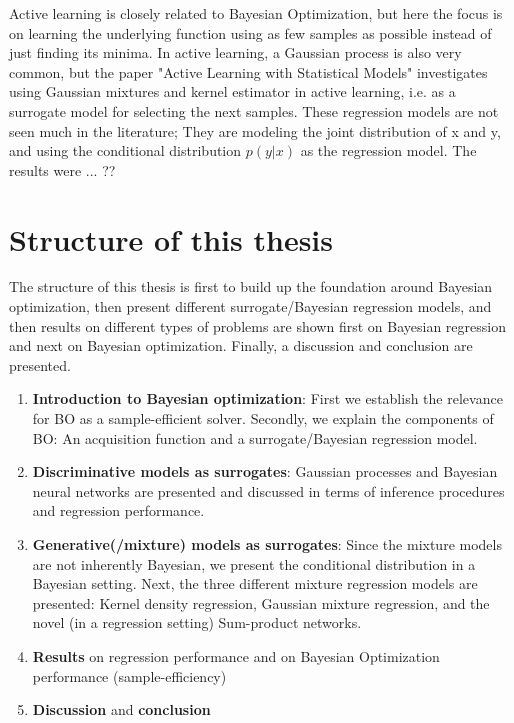 Active learning is closely related to Bayesian Optimization, but here the focus is on learning the
underlying function using as few samples as possible instead of just finding its minima. In active
learning, a Gaussian process is also very common, but the paper "Active Learning with Statistical
Models" \cite{ALStatisticalModels} investigates using Gaussian mixtures and kernel estimator in
active learning, i.e. as a surrogate model for selecting the next samples. These regression
models are not seen much in the literature; They are modeling the joint distribution of x and y, and
using the conditional distribution $p(y|x)$ as the regression model. The results were ... ??

\section{Structure of this thesis}
The structure of this thesis is first to build up the foundation around Bayesian optimization, then
present different surrogate/Bayesian regression models, and then results on different types of
problems are shown first on Bayesian regression and next on Bayesian optimization. Finally, a
discussion and conclusion are presented. 

\begin{enumerate}[noitemsep]
    \item \textbf{Introduction to Bayesian optimization}: First we establish the relevance for BO as a
    sample-efficient solver. Secondly, we explain the components of BO: An acquisition function and a 
    surrogate/Bayesian regression model.
    \item \textbf{Discriminative models as surrogates}: Gaussian processes and Bayesian neural
    networks are presented and discussed in terms of inference procedures and regression performance. 
    \item \textbf{Generative(/mixture) models as surrogates}: Since the mixture models are not 
    inherently Bayesian, we present the conditional distribution in a Bayesian setting. 
    Next, the three different mixture regression models are presented: Kernel density regression, Gaussian mixture regression,
    and the novel (in a regression setting) Sum-product networks.
    \item \textbf{Results} on regression performance and on Bayesian Optimization performance (sample-efficiency)
    \item \textbf{Discussion} and \textbf{conclusion}
\end{enumerate}

